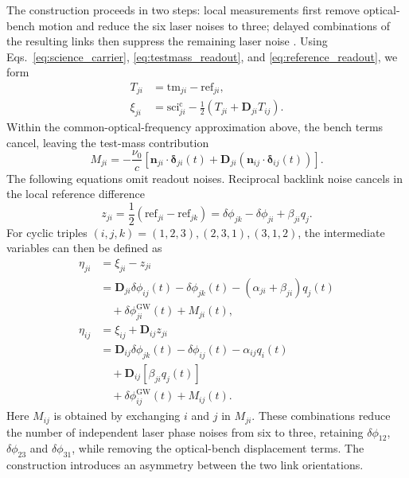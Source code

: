 The construction proceeds in two steps: local measurements first remove optical-bench motion and reduce the six laser noises to three; delayed combinations of the resulting links then suppress the remaining laser noise \cite{otto2012tdi,tinto2018time}.
Using Eqs.~\eqref{eq:science_carrier}, \eqref{eq:testmass_readout}, and \eqref{eq:reference_readout}, we form
\begin{align*}
    T_{ji}&=\text{tm}_{ji}-\text{ref}_{ji},\\
    \xi_{ji}&=\text{sci}^{\mathrm c}_{ji}
    -\frac12\left(T_{ji}+\mathbf D_{ji}T_{ij}\right).
\end{align*}
Within the common-optical-frequency approximation above, the bench terms cancel, leaving the test-mass contribution
\begin{equation*}
    M_{ji}=-\frac{\nu_0}{c}\left[
    \mathbf n_{ji}\cdot\bm\delta_{ji}(t)
    +\mathbf D_{ji}\!\left(\mathbf n_{ij}\cdot\bm\delta_{ij}(t)\right)
    \right].
\end{equation*}
The following equations omit readout noises. Reciprocal backlink noise cancels in the local reference difference
\begin{equation*}
    z_{ji}=\frac12\left(\text{ref}_{ji}-\text{ref}_{jk}\right)
    =\delta\phi_{jk}-\delta\phi_{ji}+\beta_{ji}q_j.
\end{equation*}
For cyclic triples $(i,j,k)=(1,2,3),(2,3,1),(3,1,2)$, the intermediate variables can then be defined as
\begin{align*}
    \eta_{ji}&=\xi_{ji}-z_{ji}\\
    &=\mathbf D_{ji}\delta\phi_{ij}(t)-\delta\phi_{jk}(t)
    -(\alpha_{ji}+\beta_{ji})q_j(t)\\
    &\quad+\delta\phi^{\mathrm{GW}}_{ji}(t)+M_{ji}(t),\\[3pt]
    \eta_{ij}&=\xi_{ij}+\mathbf D_{ij}z_{ji}\\
    &=\mathbf D_{ij}\delta\phi_{jk}(t)-\delta\phi_{ij}(t)
    -\alpha_{ij}q_i(t)\\
    &\quad+\mathbf D_{ij}\!\left[\beta_{ji}q_j(t)\right]\\
    &\quad+\delta\phi^{\mathrm{GW}}_{ij}(t)+M_{ij}(t).
\end{align*}
Here $M_{ij}$ is obtained by exchanging $i$ and $j$ in $M_{ji}$. These combinations reduce the number of independent laser phase noises from six to three, retaining $\delta\phi_{12}$, $\delta\phi_{23}$ and $\delta\phi_{31}$, while removing the optical-bench displacement terms. The construction introduces an asymmetry between the two link orientations.


